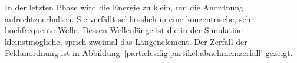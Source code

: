 
In der letzten Phase wird die Energie zu klein, um die Anordnung aufrechtzuerhalten. 
Sie verfällt schliesslich in eine konzentrische, sehr hochfrequente Welle. 
Dessen Wellenlänge ist die in der Simulation kleinstmögliche, sprich zweimal das Längenelement.
Der Zerfall der Feldanordnung ist in Abbildung~\ref{particles:fig:partikel:abnehmen:zerfall} gezeigt.


